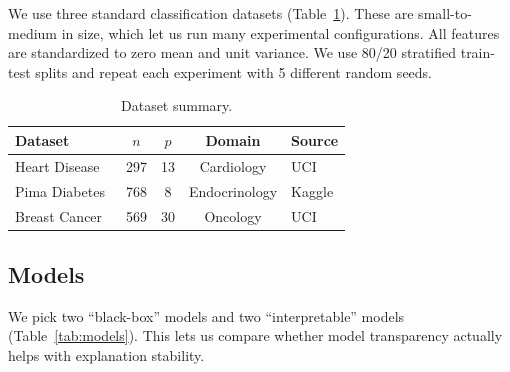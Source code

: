 \documentclass[10pt,twocolumn]{article}
\begin{document}
We use three standard classification datasets (Table~\ref{tab:datasets}).
These are small-to-medium in size, which let us run many
experimental configurations. All features are standardized to
zero mean and unit variance. We use 80/20 stratified train-test
splits and repeat each experiment with 5 different random seeds.

\begin{table}[t]
\centering
\caption{Dataset summary.}\label{tab:datasets}
\small
\begin{tabular}{@{}lcccl@{}}
\toprule
\textbf{Dataset} & $n$ & $p$ & \textbf{Domain} & \textbf{Source} \\
\midrule
Heart Disease~\cite{uci_heart}        & 297  & 13 & Cardiology     & UCI    \\
Pima Diabetes~\cite{smith1988pima}     & 768  &  8 & Endocrinology  & Kaggle \\
Breast Cancer~\cite{wolberg1995breast} & 569  & 30 & Oncology       & UCI    \\
\bottomrule
\end{tabular}
\end{table}

\subsection{Models}\label{sec:models}

We pick two ``black-box'' models and two ``interpretable'' models
(Table~\ref{tab:models}). This lets us compare whether model
transparency actually helps with explanation stability.

\begin{table}[t]
\centering
\caption{Model configurations.}\label{tab:models}
\small
{}
\end{table}
\end{document}
